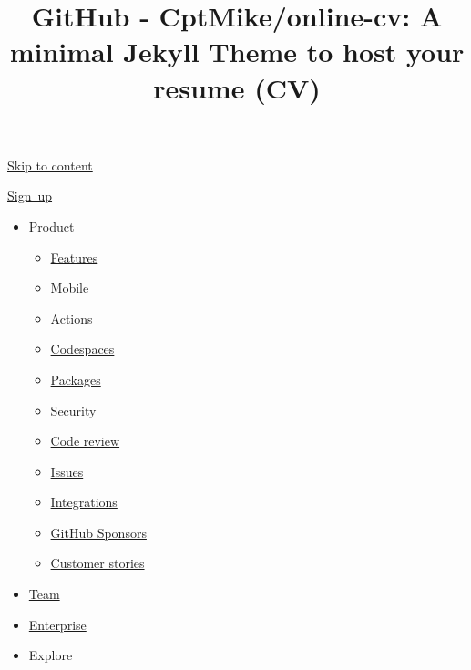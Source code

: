 \documentclass[
  english,
]{article}
\title{GitHub - CptMike/online-cv: A minimal Jekyll Theme to host your
resume (CV)}
\author{}
\date{}
\providecommand{\tightlist}{%
  \setlength{\itemsep}{0pt}\setlength{\parskip}{0pt}}
\begin{document}
\maketitle

\protect\hyperlink{start-of-content}{Skip to content} { {} }

\href{https://github.com/}{}

\href{/signup?ref_cta=Sign+up\&ref_loc=header+logged+out\&ref_page=\%2F\%3Cuser-name\%3E\%2F\%3Crepo-name\%3E\&source=header-repo}{Sign~up}

\begin{itemize}
\tightlist
\item
  Product

  \begin{itemize}
  \tightlist
  \item
    \href{/features}{Features}
  \item
    \href{/mobile}{Mobile}
  \item
    \href{/features/actions}{Actions}
  \item
    \href{/features/codespaces}{Codespaces}
  \item
    \href{/features/packages}{Packages}
  \item
    \href{/features/security}{Security}
  \item
    \href{/features/code-review}{Code review}
  \item
    \href{/features/issues}{Issues}
  \item
    \href{/features/integrations}{Integrations}
  \item
    \href{/sponsors}{GitHub Sponsors}
  \item
    \href{/customer-stories}{Customer stories}
  \end{itemize}
\item
  \href{/team}{Team}
\item
  \href{/enterprise}{Enterprise}
\item
  Explore


\end{itemize}
\end{document}
